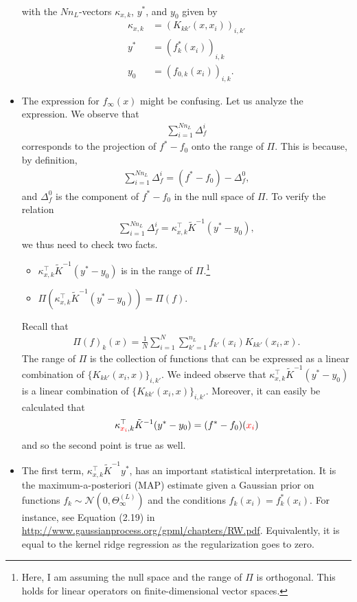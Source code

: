 \documentclass[10pt]{article}
\newcommand{\NN}{\mathcal{N}}
\newcommand{\paran}[1]{{( #1 )}}
\begin{document}
\begin{itemize}
\begin{align*}
\end{align*}
with the $Nn_L$-vectors $\kappa_{x,k}$, $y^*$, and $y_0$ given by
\begin{align*}
\kappa_{x,k} &= (K_{kk'}(x,x_i))_{i,k'} \\
y^* &= (f^*_k(x_i))_{i,k} \\
y_0 &= (f_{0,k}(x_i))_{i,k}.
\end{align*}
\item The expression for $f_\infty(x)$ might be confusing. Let us analyze the expression. We observe that
\begin{align*}
\sum_{i = 1}^{Nn_L} \Delta^i_f
\end{align*}
corresponds to the projection of $f^* - f_0$ onto the range of $\Pi$. This is because, by definition,
\begin{align*}
\sum_{i = 1}^{Nn_L} \Delta^i_f = (f^* - f_0) - \Delta^0_f,
\end{align*}
and $\Delta^0_f$ is the component of $f^* - f_0$ in the null space of $\Pi$. To verify the relation
\begin{align*}
\sum_{i = 1}^{Nn_L} \Delta^i_f = \kappa^\top_{x,k} \tilde{K}^{-1} (y^* - y_0),
\end{align*}
we thus need to check two facts.
\begin{itemize}
\item $\kappa^\top_{x,k} \tilde{K}^{-1} (y^* - y_0)$ is in the range of $\Pi$.\footnote{Here, I am assuming the null space and the range of $\Pi$ is orthogonal. This holds for linear operators on finite-dimensional vector spaces.}
\item $\Pi(\kappa^\top_{x,k} \tilde{K}^{-1} (y^* - y_0)) = \Pi(f)$.
\end{itemize}
Recall that
\begin{align*}
\Pi(f)_k(x) = \frac{1}{N} \sum_{i = 1}^N \sum_{k' = 1}^{n_L} f_{k'}(x_i) K_{kk'}(x_i,x).
\end{align*}
The range of $\Pi$ is the collection of functions that can be expressed as a linear combination of $\{K_{kk'}(x_i,x)\}_{i,k'}$. We indeed observe that $\kappa^\top_{x,k} \tilde{K}^{-1} (y^* - y_0)$ is a linear combination of $\{K_{kk'}(x_i,x)\}_{i,k'}$. Moreover, it can easily be calculated that
\begin{align*}
\kappa^\top_{\textcolor{red}{x_i},k} \tilde{K}^{-1} (y^* - y_0) = (f^* - f_0)(\textcolor{red}{x_i})
\end{align*}
and so the second point is true as well.
\item The first term, $\kappa^\top_{x,k} \tilde{K}^{-1} y^*$, has an important statistical interpretation. It is the maximum-a-posteriori (MAP) estimate given a Gaussian prior on functions $f_k \sim \NN(0,\Theta^\paran{L}_\infty)$ and the conditions $f_k(x_i) = f^*_k(x_i)$. For instance, see Equation (2.19) in \url{http://www.gaussianprocess.org/gpml/chapters/RW.pdf}. Equivalently, it is equal to the kernel ridge regression as the regularization goes to zero.

\end{itemize}
\end{document}
